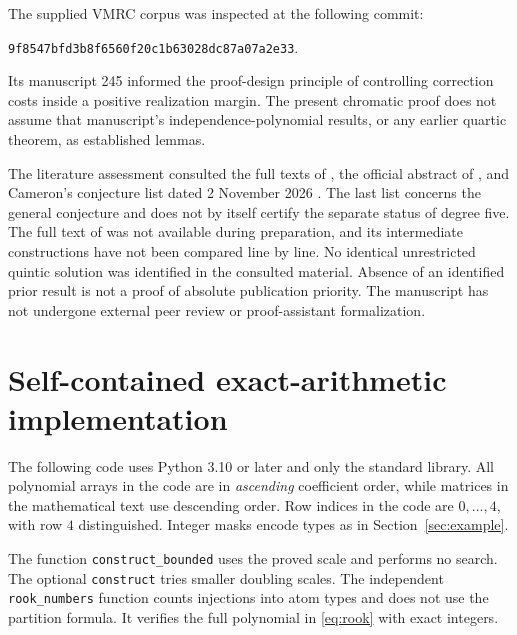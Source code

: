 \documentclass[11pt,a4paper]{article}
\theoremstyle{definition}
\begin{document}
The supplied VMRC corpus was inspected at the following commit:
\begin{center}
\texttt{9f8547bfd3b8f6560f20c1b63028dc87a07a2e33}.
\end{center}
Its manuscript 245 informed the proof-design principle of controlling
correction costs inside a positive realization margin. The present
chromatic proof does not assume that manuscript's independence-polynomial
results, or any earlier quartic theorem, as established lemmas.

The literature assessment consulted the full texts of
\cite{CM,Bohn,Gilmore,DM22}, the official abstract of \cite{DM19}, and
Cameron's conjecture list dated 2 November 2026 \cite{CameronWeb}.
The last list concerns the general conjecture and does not by itself
certify the separate status of degree five.
The full text of \cite{DM19} was not available during preparation, and
its intermediate constructions have not been compared line by line.
No identical unrestricted quintic solution was identified in the
consulted material. Absence of an identified prior result is not a proof
of absolute publication priority. The manuscript has not undergone
external peer review or proof-assistant formalization.

\appendix
\section{Self-contained exact-arithmetic implementation}\label{app:code}

The following code uses Python 3.10 or later and only the standard library.
All polynomial arrays in the code are in \emph{ascending} coefficient
order, while matrices in the mathematical text use descending order.
Row indices in the code are $0,\ldots,4$, with row $4$ distinguished.
Integer masks encode types as in Section~\ref{sec:example}.

The function \texttt{construct\_bounded} uses the proved scale and performs
no search. The optional \texttt{construct} tries smaller doubling scales.
The independent \texttt{rook\_numbers} function counts injections into atom
types and does not use the partition formula. It verifies the full
polynomial in \eqref{eq:rook} with exact integers.
\end{document}
